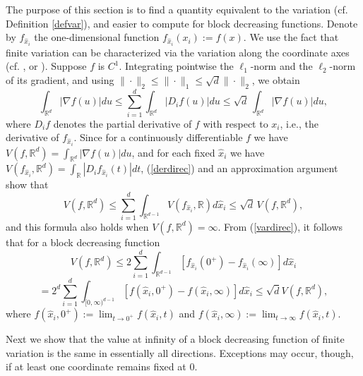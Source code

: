 \documentclass[12pt]{amsart}
\numberwithin{equation}{section}
\theoremstyle{plain}
\theoremstyle{definition}
\theoremstyle{remark}
\begin{document}
The purpose of this section is to find a quantity equivalent to
the variation (cf. Definition \ref{defvar}), and easier to compute for block decreasing functions.
Denote by $f_{\hat{x}_i}$ the one-dimensional function
$f_{\hat{x}_i}(x_i):=f(x)$. We use the fact that finite variation can be characterized via the variation along the coordinate axes (cf. \cite[p. 196]{AFP}, or \cite[\S5.10]{EvGa}). Suppose $f$ is $C^1$. Integrating
pointwise the $\ell_1$-norm and the $\ell_2$-norm of its gradient, and using
$\|\cdot\|_2\le \|\cdot\|_1\le \sqrt{d}\|\cdot\|_2$, we obtain
\begin{equation}\label{derdirec}
  \int_{\mathbb{R}^d}|\nabla
f(u)|du\le \sum_{i=1}^d \int_{\mathbb{R}^d}|D_if(u)|du \le
\sqrt{d}\,\int_{\mathbb{R}^d}|\nabla f(u)|du,
\end{equation}
where $D_i f$ denotes the partial derivative of $f$ with respect to
$x_i$, i.e., the derivative of $f_{\hat{x}_i}$.
Since for a continuously differentiable $f$ we have
$V(f,\mathbb{R}^d)=\int_{\mathbb{R}^d}|\nabla
f(u)|du$, and for each fixed $\hat{x}_i$
we have $V(f_{\hat{x}_i},\mathbb{R}^d)=
 \int_{\mathbb{R}}|D_i f_{\hat{x}_i} (t)| dt$, (\ref{derdirec}) and
 an approximation
argument show that
\begin{equation}\label{vardirec}
  V(f,\mathbb{R}^d)\le \sum_{i=1}^d
  \int_{\mathbb{R}^{d-1}}V(f_{\hat{x}_i},\mathbb{R})d\hat{x}_i \le
\sqrt{d}\,
  V(f,\mathbb{R}^d),
\end{equation}
and this formula also holds when $V(f,\mathbb{R}^d) =\infty$.
From (\ref{vardirec}), it follows that for a block decreasing function
\begin{equation}\label{equivar}
 V(f,\mathbb{R}^d) \le  2 \sum_{i=1}^d
  \int_{\mathbb{R}^{d-1}}
  [f_{\hat{x}_i}(0^+)-f_{\hat{x}_i}(\infty)]d\hat{x}_i
  \end{equation}
\begin{equation}\label{equivar1}
 = 2^d \sum_{i=1}^d
  \int_{[0,\infty)^{d-1}}
  [f(\hat{x}_i,0^+)-f(\hat{x}_i,\infty)]d\hat{x}_i
  \le \sqrt{d} V(f,\mathbb{R}^d),
\end{equation}
where $f(\hat{x}_i,0^+):=\lim_{t\rightarrow 0^+}f(\hat{x}_i,t)$ and
$f(\hat{x}_i,\infty):=\lim_{t\rightarrow\infty}f(\hat{x}_i,t)$.

Next we show that the value at
infinity of a block decreasing function of finite variation is the
same in essentially all directions. Exceptions may occur, though, if
at least one coordinate remains fixed at $0$.
\end{document}
